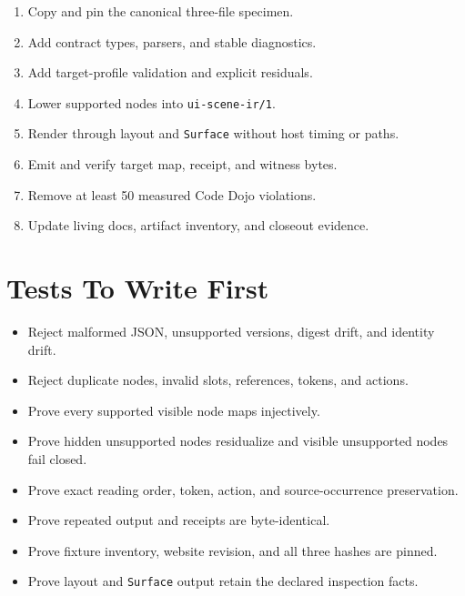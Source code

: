 \begin{enumerate}
\def\labelenumi{\arabic{enumi}.}
\tightlist
\item
  Copy and pin the canonical three-file specimen.
\item
  Add contract types, parsers, and stable diagnostics.
\item
  Add target-profile validation and explicit residuals.
\item
  Lower supported nodes into \texttt{u\allowbreak{}i\allowbreak{}-\allowbreak{}s\allowbreak{}c\allowbreak{}e\allowbreak{}n\allowbreak{}e\allowbreak{}-\allowbreak{}i\allowbreak{}r\allowbreak{}/\allowbreak{}1}.
\item
  Render through layout and \texttt{S\allowbreak{}u\allowbreak{}r\allowbreak{}f\allowbreak{}a\allowbreak{}c\allowbreak{}e} without host timing or paths.
\item
  Emit and verify target map, receipt, and witness bytes.
\item
  Remove at least 50 measured Code Dojo violations.
\item
  Update living docs, artifact inventory, and closeout evidence.
\end{enumerate}

\section{Tests To Write First}\label{record-146-tests-to-write-first}

\begin{itemize}
\tightlist
\item
  Reject malformed JSON, unsupported versions, digest drift, and identity drift.
\item
  Reject duplicate nodes, invalid slots, references, tokens, and actions.
\item
  Prove every supported visible node maps injectively.
\item
  Prove hidden unsupported nodes residualize and visible unsupported nodes fail closed.
\item
  Prove exact reading order, token, action, and source-occurrence preservation.
\item
  Prove repeated output and receipts are byte-identical.
\item
  Prove fixture inventory, website revision, and all three hashes are pinned.
\item
  Prove layout and \texttt{S\allowbreak{}u\allowbreak{}r\allowbreak{}f\allowbreak{}a\allowbreak{}c\allowbreak{}e} output retain the declared inspection facts.
\end{itemize}

